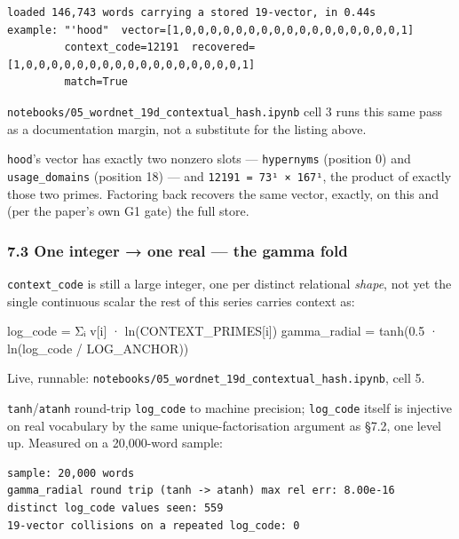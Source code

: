 \documentclass[
  10pt,
]{article}
\newenvironment{Shaded}{}{}
\newcommand{\FloatTok}[1]{\textcolor[rgb]{0.25,0.63,0.44}{#1}}
\newcommand{\NormalTok}[1]{#1}
\newcommand{\OperatorTok}[1]{\textcolor[rgb]{0.40,0.40,0.40}{#1}}
\begin{document}
\begin{verbatim}
loaded 146,743 words carrying a stored 19-vector, in 0.44s
example: "'hood"  vector=[1,0,0,0,0,0,0,0,0,0,0,0,0,0,0,0,0,0,1]
         context_code=12191  recovered=[1,0,0,0,0,0,0,0,0,0,0,0,0,0,0,0,0,0,1]
         match=True
\end{verbatim}

\texttt{notebooks/05\_wordnet\_19d\_contextual\_hash.ipynb} cell 3 runs
this same pass as a documentation margin, not a substitute for the
listing above.

\texttt{\textquotesingle{}hood}'s vector has exactly two nonzero slots
--- \texttt{hypernyms} (position 0) and \texttt{usage\_domains}
(position 18) --- and \texttt{12191\ =\ 73¹\ ×\ 167¹}, the product of
exactly those two primes. Factoring back recovers the same vector,
exactly, on this and (per the paper's own G1 gate) the full store.

\hypertarget{one-integer-one-real-the-gamma-fold}{%
\subsubsection{7.3 One integer → one real --- the gamma
fold}\label{one-integer-one-real-the-gamma-fold}}

\texttt{context\_code} is still a large integer, one per distinct
relational \emph{shape}, not yet the single continuous scalar the rest
of this series carries context as:

\begin{Shaded}
\begin{Highlighting}[]
\NormalTok{log\_code     }\OperatorTok{=}\NormalTok{ Σᵢ v[i] · ln(CONTEXT\_PRIMES[i])}
\NormalTok{gamma\_radial }\OperatorTok{=}\NormalTok{ tanh(}\FloatTok{0.5}\NormalTok{ · ln(log\_code }\OperatorTok{/}\NormalTok{ LOG\_ANCHOR))}
\end{Highlighting}
\end{Shaded}

Live, runnable:
\texttt{notebooks/05\_wordnet\_19d\_contextual\_hash.ipynb}, cell 5.

\texttt{tanh}/\texttt{atanh} round-trip \texttt{log\_code} to machine
precision; \texttt{log\_code} itself is injective on real vocabulary by
the same unique-factorisation argument as §7.2, one level up. Measured
on a 20,000-word sample:

\begin{verbatim}
sample: 20,000 words
gamma_radial round trip (tanh -> atanh) max rel err: 8.00e-16
distinct log_code values seen: 559
19-vector collisions on a repeated log_code: 0
\end{verbatim}
\end{document}
